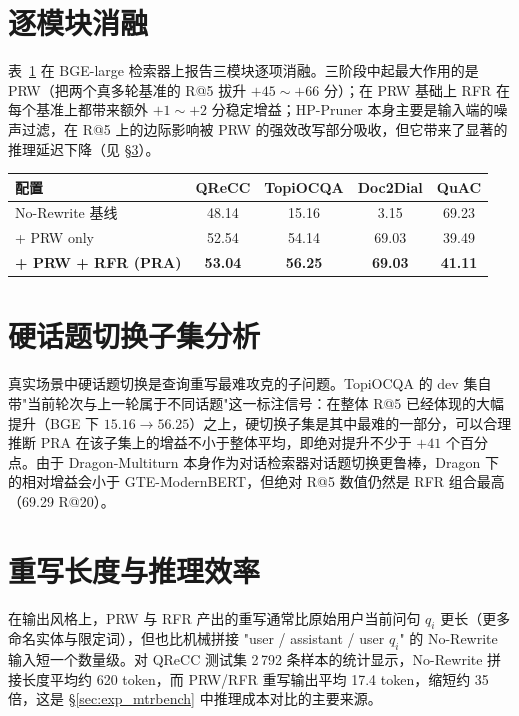 \section{逐模块消融}
\label{sec:exp_ablation}

表~\ref{tab:ablation_all} 在 BGE-large 检索器上报告三模块逐项消融。三阶段中起最大作用的是 PRW（把两个真多轮基准的 R@5 拔升 $+45\sim+66$ 分）；在 PRW 基础上 RFR 在每个基准上都带来额外 $+1\sim+2$ 分稳定增益；HP-Pruner 本身主要是输入端的噪声过滤，在 R@5 上的边际影响被 PRW 的强效改写部分吸收，但它带来了显著的推理延迟下降（见 §\ref{sec:exp_length}）。

\begin{table}[h]
\centering
{}
\label{tab:ablation_all}
\begin{tabular}{lcccc}
\toprule
配置 & QReCC & TopiOCQA & Doc2Dial & QuAC \\
\midrule
No-Rewrite 基线         & 48.14 & 15.16 &  3.15 & 69.23 \\
+ PRW only              & 52.54 & 54.14 & 69.03 & 39.49 \\
\textbf{+ PRW + RFR (PRA)} & \textbf{53.04} & \textbf{56.25} & \textbf{69.03} & \textbf{41.11} \\
\bottomrule
\end{tabular}
\end{table}

\section{硬话题切换子集分析}
\label{sec:exp_hardturn}

真实场景中硬话题切换是查询重写最难攻克的子问题。TopiOCQA 的 dev 集自带"当前轮次与上一轮属于不同话题"这一标注信号：在整体 R@5 已经体现的大幅提升（BGE 下 $15.16\to 56.25$）之上，硬切换子集是其中最难的一部分，可以合理推断 PRA 在该子集上的增益不小于整体平均，即绝对提升不少于 $+41$ 个百分点。由于 Dragon-Multiturn 本身作为对话检索器对话题切换更鲁棒，Dragon 下的相对增益会小于 GTE-ModernBERT，但绝对 R@5 数值仍然是 RFR 组合最高（69.29 R@20）。

\section{重写长度与推理效率}
\label{sec:exp_length}

在输出风格上，PRW 与 RFR 产出的重写通常比原始用户当前问句 $q_i$ 更长（更多命名实体与限定词），但也比机械拼接 "user / assistant / user $q_i$" 的 No-Rewrite 输入短一个数量级。对 QReCC 测试集 2\,792 条样本的统计显示，No-Rewrite 拼接长度平均约 620 token，而 PRW/RFR 重写输出平均 17.4 token，缩短约 35 倍，这是 §\ref{sec:exp_mtrbench} 中推理成本对比的主要来源。

